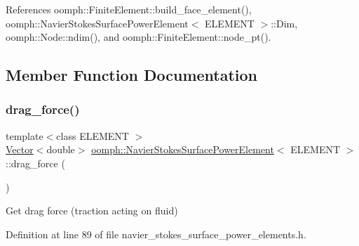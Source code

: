 References oomph\+::\+Finite\+Element\+::build\+\_\+face\+\_\+element(), oomph\+::\+Navier\+Stokes\+Surface\+Power\+Element$<$ E\+L\+E\+M\+E\+N\+T $>$\+::\+Dim, oomph\+::\+Node\+::ndim(), and oomph\+::\+Finite\+Element\+::node\+\_\+pt().



\subsection{Member Function Documentation}
\mbox{\label{classoomph_1_1NavierStokesSurfacePowerElement_a85b2a9f383e7a52d6789d8ec15be9222}} 
\subsubsection{\texorpdfstring{drag\+\_\+force()}{drag\_force()}\hspace{0.1cm}{\footnotesize\ttfamily [1/2]}}
{\footnotesize\ttfamily template$<$class E\+L\+E\+M\+E\+NT $>$ \\
\hyperlink{classoomph_1_1Vector}{Vector}$<$double$>$ \hyperlink{classoomph_1_1NavierStokesSurfacePowerElement}{oomph\+::\+Navier\+Stokes\+Surface\+Power\+Element}$<$ E\+L\+E\+M\+E\+NT $>$\+::drag\+\_\+force (\begin{DoxyParamCaption}{ }\end{DoxyParamCaption})\hspace{0.3cm}{\ttfamily [inline]}}



Get drag force (traction acting on fluid) 



Definition at line 89 of file navier\+\_\+stokes\+\_\+surface\+\_\+power\+\_\+elements.\+h.

\mbox{\label{classoomph_1_1NavierStokesSurfacePowerElement_a0f98b1da199fd971c7b8b6a9fb74ce60}} 
